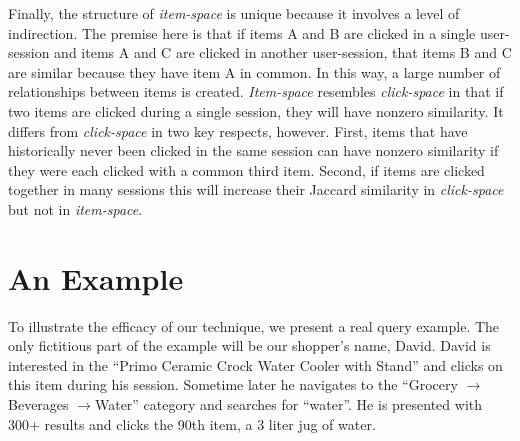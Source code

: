 \documentclass{article}
\begin{document}
Finally, the structure of {\em item-space} is unique because it involves a level
of indirection. The premise here is that if items A and B are clicked in a
single user-session and items A and C are clicked in another user-session, that
items B and C are similar because they have item A in common. In this way, a
large number of relationships between items is created. {\em Item-space}
resembles {\em click-space} in that if two items are clicked during a single
session, they will have nonzero similarity. It differs from {\em click-space} in
two key respects, however. First, items that have historically never been
clicked in the same session can have nonzero similarity if they were each
clicked with a common third item. Second, if items are clicked together in many
sessions this will increase their Jaccard similarity in {\em click-space} but
not in {\em item-space}.

\section{An Example}





To illustrate the efficacy of our technique, we present a real query example.
The only fictitious part of the example will be our shopper's name, David.
David is interested in the ``Primo Ceramic Crock Water Cooler with Stand'' and
clicks on this item during his session. Sometime later he navigates to the
``Grocery $\rightarrow $Beverages $\rightarrow $Water'' category and searches
for ``water''. He is presented with 300+ results and clicks the 90th item, a 3 liter
jug of water.
\end{document}
